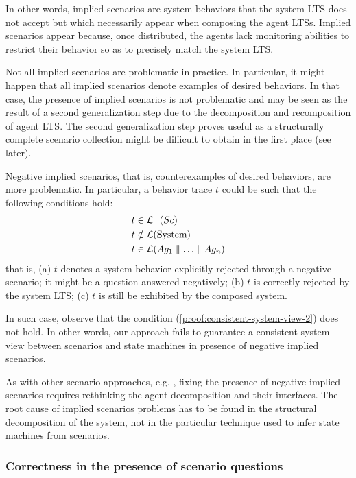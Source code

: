 In other words, implied scenarios are system behaviors that the system LTS does not accept but which necessarily appear when composing the agent LTSs. Implied scenarios appear because, once distributed, the agents lack monitoring abilities to restrict their behavior so as to precisely match the system LTS.

Not all implied scenarios are problematic in practice. In particular, it might happen that all implied scenarios denote examples of desired behaviors. In that case, the presence of implied scenarios is not problematic and may be seen as the result of a second generalization step due to the decomposition and recomposition of agent LTS. The second generalization step proves useful as a structurally complete scenario collection might be difficult to obtain in the first place (see later).

Negative implied scenarios, that is, counterexamples of desired behaviors, are more problematic. In particular, a behavior trace $t$ could be such that the following conditions hold:
\begin{align}
&t \in \mathcal{L}^-(Sc)\\
&t \notin \mathcal{L}(\mbox{System})\\
&t \in \mathcal{L}(Ag_1 \parallel \ldots \parallel Ag_n)
\end{align}
that is, (a) $t$ denotes a system behavior explicitly rejected through a negative scenario; it might be a question answered negatively; (b) $t$ is correctly rejected by the system LTS; (c) $t$ is still be exhibited by the composed system.

In such case, observe that the condition (\ref{proof:consistent-system-view-2}) does not hold. In other words, our approach fails to guarantee a consistent system view between scenarios and state machines in presence of negative implied scenarios.

As with other scenario approaches, e.g. \cite{Alur:2000, Uchitel:2004}, fixing the presence of negative implied scenarios requires rethinking the agent decomposition and their interfaces. The root cause of implied scenarios problems has to be found in the structural decomposition of the system, not in the particular technique used to infer state machines from scenarios.

\subsubsection*{Correctness in the presence of scenario questions}


